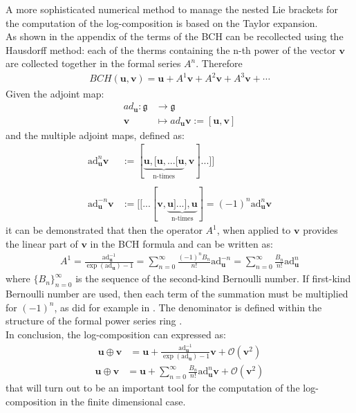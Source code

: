 A more sophisticated numerical method to manage the nested Lie brackets for the computation of the log-composition is based on the Taylor expansion. \\
As shown in the appendix of \cite{klarsfeld1989baker} the terms of the BCH can be recollected using the Hausdorff method: each of the therms containing the n-th power of the vector $\mathbf{v}$ are collected together in the formal series $A^{n}$. Therefore
\begin{align*}
BCH(\mathbf{u},\mathbf{v}) 
= 
\mathbf{u} + A^{1} \mathbf{v} + A^{2} \mathbf{v} + A^{3} \mathbf{v} + \cdots
\end{align*}
Given the adjoint map:
\begin{align*}
ad_{\mathbf{u}} : \mathfrak{g}  & \longrightarrow \mathfrak{g}  
\\
\mathbf{v} &\longmapsto ad_{\mathbf{u}}   \mathbf{v} :=  [\mathbf{u}, \mathbf{v}]
\end{align*}
and the multiple adjoint maps, defined as:
\begin{align*}
\text{ad}_{\mathbf{u}}^{n} \mathbf{v} 
&:= [  \underbrace{   \mathbf{u},[\mathbf{u},... [\mathbf{u}}_{\text{n-times}},\mathbf{v}]...]] 
\\
\\
\text{ad}_{\mathbf{u}}^{-n} \mathbf{v} 
&:= [[...[  \mathbf{v}, \underbrace{   \mathbf{u}]...],\mathbf{u}}_{\text{n-times}}]
= (-1)^n \text{ad}_{\mathbf{u}}^{n} \mathbf{v} 
\end{align*}
it can be demonstrated that then the operator $A^{1}$, when applied to $\mathbf{v}$ provides the linear part of $\mathbf{v}$ in the BCH formula and can be written as:
\begin{align*}
A^{1}
= 
\frac{  
	\text{ad}_{\mathbf{u}}^{-1} 
	}{
	\exp{(\text{ad}_{\mathbf{u}})}-1
	}
=
\sum_{n=0}^{\infty} \frac{(-1)^nB_{n}}{n!} \text{ad}_{\mathbf{u}}^{ - n} 
=
\sum_{n=0}^{\infty} \frac{B_{n}}{n!} \text{ad}_{\mathbf{u}}^{ n} 
\end{align*}
where $\lbrace B_{n} \rbrace_{n=0}^{\infty} $ is the sequence of the second-kind Bernoulli number. If first-kind Bernoulli number are used, then each term of the summation must be multiplied for $(-1)^{n}$, as did for example in \cite{klarsfeld1989baker}. The denominator is defined within the structure of the formal power series ring \cite{mariconda2013calcolo}.\\
In conclusion, the log-composition can expressed as:
\begin{align*}
\mathbf{u}\oplus \mathbf{v}  
&= 
\mathbf{u} + 
\frac{  
	\text{ad}_{\mathbf{u}}^{-1} 
}{
\exp{(\text{ad}_{\mathbf{u}})}-1
} \mathbf{v}  
+ 
\mathcal{O}(\mathbf{v} ^2) 
\end{align*}
\begin{align}\label{eq:taylor}
\mathbf{u}\oplus \mathbf{v}  
&=
\mathbf{u} 
+
\sum_{n=0}^{\infty} \frac{B_{n}}{n!} \text{ad}_{\mathbf{u}}^{ n} 
\mathbf{v}  
+
\mathcal{O}(\mathbf{v} ^2)
\end{align}
that will turn out to be an important tool for the computation of the log-composition in the finite dimensional case. 

